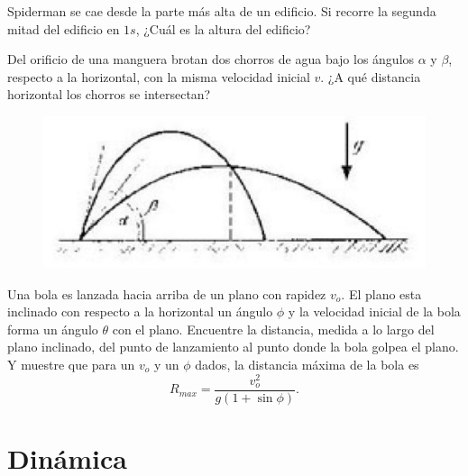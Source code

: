 \begin{ejercicio}
		Spiderman se cae desde la parte más alta de un edificio. Si recorre la segunda mitad del edificio en $1s$, ¿Cuál es la altura del edificio?
\end{ejercicio}



\begin{ejercicio}
	Del orificio de una manguera brotan dos chorros de agua bajo los ángulos $\alpha$ y $\beta$, respecto a la horizontal, con la misma velocidad inicial $v$. ¿A qué distancia horizontal los chorros se intersectan?
	\begin{figure}[H]
		\centering
		\includegraphics[scale=0.3]{./img/chorros.png}
	\end{figure}
\end{ejercicio}



\begin{ejercicio}
	Una bola es lanzada hacia arriba de un plano con rapidez $v_o$. El plano esta inclinado con respecto a la horizontal un ángulo $\phi$ y la velocidad inicial de la bola forma un ángulo $\theta$ con el plano. Encuentre la distancia, medida a lo largo del plano inclinado, del punto de lanzamiento al punto donde la bola golpea el plano. Y muestre que para un $v_o$ y un $\phi$ dados, la distancia máxima de la bola es
		$$ R_{max} = \frac{v_o ^2}{g(1 + \sin{\phi})}. $$
\end{ejercicio}




\section*{Dinámica}

